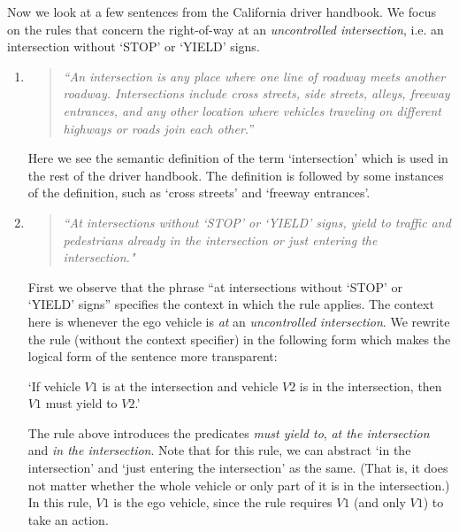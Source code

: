 Now we look at a few sentences from the California driver handbook.
We focus on the rules that concern the right-of-way at an \emph{uncontrolled intersection},
i.e. an intersection without `STOP' or `YIELD' signs\cite{FHWA-Unsignalized.2019}.
\begin{enumerate}
\item
\begin{quote}
{\em ``An intersection is any place where one line of roadway meets another roadway.
Intersections include
cross streets, side streets, alleys, freeway entrances, and
any other location where vehicles traveling on different highways or roads join each other.''
\cite[p. 35]{DMV-California.2019}}
\end{quote} 

Here we see the semantic definition of the term `intersection' 
which is used in the rest of the driver handbook.
The definition is followed by some instances of the definition, such as `cross streets' and `freeway entrances'.
\item \label{rule:yieldToInside}
\begin{quote}
{\em ``At intersections without `STOP' or `YIELD' signs,
yield to traffic and pedestrians already in the intersection or just entering the intersection."
\cite[p. 36]{DMV-California.2019}}
\end{quote}

First we observe that the phrase
``at intersections without `STOP' or `YIELD' signs''
specifies the context in which the rule applies.
The context here is
whenever the ego vehicle is \emph{at} an \emph{uncontrolled intersection}.
We rewrite the rule (without the context specifier) in the following form
which makes the logical form of the sentence more transparent:
\begin{center}
`If vehicle $V1$ is at the intersection and
vehicle $V2$ is in the intersection,
then $V1$ must yield to $V2$.'
\end{center}

The rule above introduces the predicates
\emph{must yield to},
\emph{at the intersection} and \emph{in the intersection}.
Note that for this rule,
we can abstract `in the intersection' and `just entering the intersection' as the same.
(That is, it does not matter whether the whole vehicle or only part of it is in the intersection.)
In this rule,
$V1$ is the ego vehicle,
since the rule requires $V1$ (and only $V1$)
to take an action.


\end{enumerate}
